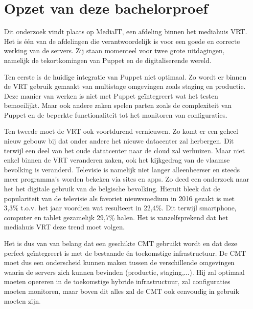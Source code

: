 \section{Opzet van deze bachelorproef}
\label{sec:opzet-bachelorproef}


Dit onderzoek vindt plaats op MediaIT, een afdeling binnen het mediahuis VRT. Het is \'e\'en van de afdelingen die verantwoordelijk is voor een goede en correcte werking van de servers. Zij staan momenteel voor twee grote uitdagingen, namelijk de tekortkomingen van Puppet en de digitaliserende wereld.

Ten eerste is de huidige integratie van Puppet niet optimaal. Zo wordt er binnen de VRT gebruik gemaakt van multistage omgevingen zoals staging en productie. Deze manier van werken is niet met Puppet ge\"integreert wat het testen bemoeilijkt. Maar ook andere zaken spelen parten zoals de complexiteit van Puppet en de beperkte functionaliteit tot het monitoren van configuraties.

Ten tweede moet de VRT ook voortdurend vernieuwen. Zo komt er een geheel nieuw gebouw bij dat onder andere het nieuwe datacenter zal herbergen. Dit terwijl een deel van het oude datatcenter naar de cloud zal verhuizen. Maar niet enkel binnen de VRT veranderen zaken, ook het kijkgedrag van de vlaamse bevolking is veranderd. Televisie is namelijk niet langer alleenheerser en steeds meer programma's worden bekeken via sites en apps. Zo deed \textcite{digimeter} een onderzoek naar het het digitale gebruik van de belgische bevolking. Hieruit bleek dat de populariteit van de televisie als favoriet nieuwsmedium in 2016 gezakt is met 3,3\% t.o.v. het jaar voordien wat resulteert in 22,4\%. Dit terwijl smartphone, computer en tablet gezamelijk 29,7\% halen. Het is vanzelfsprekend dat het mediahuis VRT deze trend moet volgen.

Het is dus van van belang dat een geschikte \gls{CMT} gebruikt wordt en dat deze perfect ge\"integreert is met de bestaande \'en toekomstige infrastructuur. De CMT moet dus een onderscheid kunnen maken tussen de verschillende omgevingen waarin de servers zich kunnen bevinden (productie, staging,...). Hij zal optimaal moeten opereren in de toekomstige hybride infrastructuur, zal configuraties moeten monitoren, maar boven dit alles zal de \gls{CMT} ook eenvoudig in gebruik moeten zijn.\newline







